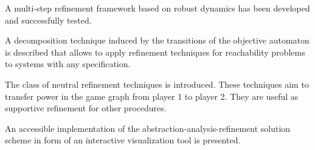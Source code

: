 \startitemize[packed]
    \item{A multi-step refinement framework based on robust dynamics has been developed and successfully tested.}
    \item{A decomposition technique induced by the transitions of the objective automaton is described that allows to apply refinement techniques for reachability problems to systems with any specification.}
    \item{The class of neutral refinement techniques is introduced. These techniques aim to transfer power in the game graph from player 1 to player 2. They are useful as supportive refinement for other procedures.}
    \item{An accessible implementation of the abstraction-analysis-refinement solution scheme in form of an interactive visualization tool is presented.}
\stopitemize

